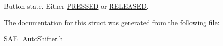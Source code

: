 Button state. Either \hyperlink{defines_8h_a654adff3c664f27f0b29c24af818dd26}{P\-R\-E\-S\-S\-E\-D} or \hyperlink{defines_8h_ad74b7f5218b46c8332cd531df7178d45}{R\-E\-L\-E\-A\-S\-E\-D}. 



The documentation for this struct was generated from the following file\-:\begin{DoxyCompactItemize}
\item 
\hyperlink{_s_a_e___auto_shifter_8h}{S\-A\-E\-\_\-\-Auto\-Shifter.\-h}\end{DoxyCompactItemize}
